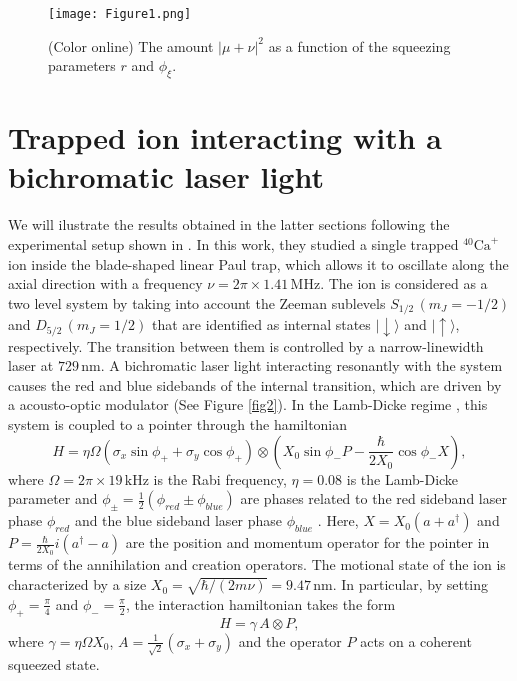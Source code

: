 \documentclass[aps,pra,preprint,superscriptaddress, showpacs]{revtex4-2}
\begin{document}
\begin{figure}
	\centering
	\texttt{[image: Figure1.png]}
	\caption{(Color online) The amount $|\mu+\nu|^2$ as a function of the squeezing parameters $r$ and $\phi_{\xi}$.}
	\label{fig1}
\end{figure}

\section{\label{sec:formalism4}Trapped ion interacting with a bichromatic laser light}

We will ilustrate the results obtained in the latter sections following the experimental setup shown in \cite{wu2019scheme}. In this work, they studied a single trapped ${}^{40}\text{Ca}^{+}$ ion inside the blade-shaped linear Paul trap, which allows it to oscillate along the axial direction with a frequency  $\nu=2\pi\times 1.41\,\text{MHz}$. The ion is considered as a two level system by taking into account the Zeeman sublevels $S_{1/2}\,(m_{J}=-1/2)$ and $D_{5/2}\,(m_{J}=1/2)$ that are identified as internal states $|\downarrow\rangle$ and $|\uparrow\rangle$, respectively. The transition between them is controlled by a narrow-linewidth laser at $729\,\text{nm}$. A bichromatic laser light interacting resonantly with the system causes the red and blue sidebands of the internal transition, which are driven by a acousto-optic modulator (See Figure \ref{fig2}). In the Lamb-Dicke regime \cite{javanainen1981laser}, this system is coupled to a pointer through the hamiltonian \cite{wallentowitz1995reconstruction, zheng1998preparation}
\begin{equation}
H=\eta\Omega\left(\sigma_{x}\sin\phi_{+}+\sigma_{y}\cos\phi_{+}\right)\otimes\left(X_{0}\sin\phi_{-} P-\frac{\hbar}{2X_{0}}\cos\phi_{-}X\right),
\end{equation}
where  $\Omega=2\pi\times 19\,\text{kHz}$ is the Rabi frequency, $\eta=0.08$ is the Lamb-Dicke parameter \cite{javanainen1981laser} and $\phi_{\pm}=\frac{1}{2}\left(\phi_{red}\pm\phi_{blue}\right)$ are phases related to the red sideband laser phase $\phi_{red}$ and the blue sideband laser phase $\phi_{blue}$ \cite{moya2012ion}. Here, $X=X_{0}\left(a+a^{\dagger}\right)$  and $P=\frac{\hbar}{2X_{0}} i \left(a^{\dagger}-a\right)$ are the position and momentum operator for the pointer in terms of the annihilation and creation operators. The motional state of the ion is characterized by a size $X_{0}=\sqrt{\hbar/(2m\nu)}=9.47\,\text{nm}$. In particular, by setting $\phi_{+}=\frac{\pi}{4}$ and $\phi_{-}=\frac{\pi}{2}$, the interaction hamiltonian takes the form
\begin{equation}
H=\gamma\,A\otimes P,
\end{equation}
where $\gamma=\eta\Omega X_{0}$, $A=\frac{1}{\sqrt{2}}\left(\sigma_{x}+\sigma_{y}\right)$ and the operator $P$ acts on a coherent squeezed state.
\end{document}
